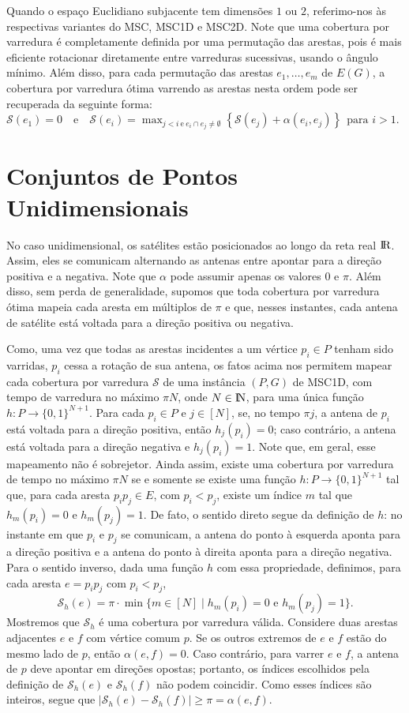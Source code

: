 \documentclass[12pt]{article}
\newcommand{\R}{\rm I\!R}
\newcommand{\N}{\rm I\!N}
\newcommand{\cals}{\mathcal{S}}
\begin{document}
Quando o espaço Euclidiano subjacente tem dimensões $1$ ou $2$, referimo-nos às respectivas variantes do MSC, MSC1D e MSC2D.
%
Note que uma cobertura por varredura é completamente definida por uma permutação das arestas, pois é mais eficiente rotacionar diretamente entre varreduras sucessivas, usando o ângulo mínimo.
%
Além disso, para cada permutação das arestas $e_1, \dots, e_m$ de $E(G)$, a cobertura por varredura ótima varrendo as arestas nesta ordem pode ser recuperada da seguinte forma:
$
\cals(e_1) = 0 \quad \text{e} \quad
\cals(e_i) = \max_{j < i\ \text{e}\ e_i \cap e_j \neq \emptyset} \left\{ \cals(e_j) + \alpha(e_i, e_j) \right\} \ \ \text{para } i > 1.
$

\section{Conjuntos de Pontos Unidimensionais}
\label{sec:msc1d}

No caso unidimensional, os satélites estão posicionados ao longo da reta real $\R$. Assim, eles se comunicam alternando as antenas entre apontar para a direção positiva e a negativa.
%
Note que $\alpha$ pode assumir apenas os valores $0$ e $\pi$. Além disso, sem perda de generalidade, supomos que toda cobertura por varredura ótima mapeia cada aresta em múltiplos de $\pi$ e que, nesses instantes, cada antena de satélite está voltada para a direção positiva ou negativa.

Como, uma vez que todas as arestas incidentes a um vértice $p_i\in P$ tenham sido varridas, $p_i$ cessa a rotação de sua antena, os fatos acima nos permitem mapear cada cobertura por varredura $\cals$ de uma instância $(P, G)$ de MSC1D, com tempo de varredura no máximo $\pi N$, onde $N\in \N$, para uma única função $h\colon P \to \{0,1\}^{N+1}$.
%
Para cada $p_i\in P$ e $j\in [N]$, se, no tempo $\pi j$, a antena de $p_i$ está voltada para a direção positiva, então ${h_j(p_i)=0}$; caso contrário, a antena está voltada para a direção negativa e ${h_j(p_i)=1}$.
%
Note que, em geral, esse mapeamento não é sobrejetor.
%
Ainda assim, existe uma cobertura por varredura de tempo no máximo $\pi N$ se e somente se existe uma função ${h\colon P \to \{0,1\}^{N+1}}$ tal que, para cada aresta $p_ip_j\in E$, com $p_i<p_j$, existe um índice $m$ tal que ${h_m(p_i)=0}$ e ${h_m(p_j)=1}$.
%
De fato, o sentido direto segue da definição de $h$: no instante em que $p_i$ e $p_j$ se comunicam, a antena do ponto à esquerda aponta para a direção positiva e a antena do ponto à direita aponta para a direção negativa.
%
Para o sentido inverso, dada uma função $h$ com essa propriedade, definimos, para cada aresta $e=p_ip_j$ com $p_i<p_j$,
\[
    \cals_h(e)=\pi \cdot \min\{m\in [N]\mid h_m(p_i)=0 \text{ e } h_m(p_j)=1\}.
\]
%
Mostremos que $\cals_h$ é uma cobertura por varredura válida.
%
Considere duas arestas adjacentes $e$ e $f$ com vértice comum $p$.
%
Se os outros extremos de $e$ e $f$ estão do mesmo lado de $p$, então $\alpha(e,f)=0$.
%
Caso contrário, para varrer $e$ e $f$, a antena de $p$ deve apontar em direções opostas; portanto, os índices escolhidos pela definição de $\cals_h(e)$ e $\cals_h(f)$ não podem coincidir.
%
Como esses índices são inteiros, segue que $|\cals_h(e)-\cals_h(f)|\ge \pi=\alpha(e,f)$.
\end{document}

